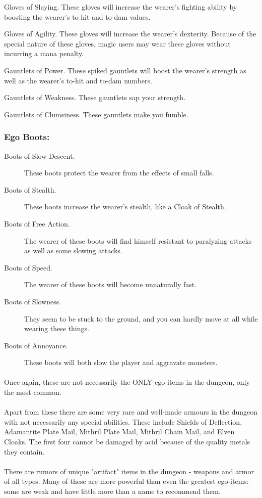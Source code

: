 Gloves of Slaying.
     These gloves will increase the wearer's fighting ability by boosting
     the wearer's to-hit and to-dam values.

Gloves of Agility.
     These gloves will increase the wearer's dexterity. Because of the
     special nature of these gloves, magic users may wear these gloves
     without incurring a mana penalty.

Gauntlets of Power.
     These spiked gauntlets will boost the wearer's strength as well as the
     wearer's to-hit and to-dam numbers.

Gauntlets of Weakness.
     These gauntlets sap your strength.

Gauntlets of Clumsiness.
     These gauntlets make you fumble.

\subsubsection{Ego Boots:}
\begin{description}
\item[Boots of Slow Descent.] These boots protect the wearer from the
effects of small falls.

\item[Boots of Stealth.] These boots increase the wearer's stealth, like
a Cloak of Stealth.

\item[Boots of Free Action.] The wearer of these boots will find himself
resistant to paralyzing attacks as well as some slowing attacks.

\item[Boots of Speed.] The wearer of these boots will become unnaturally
fast.

\item[Boots of Slowness.] They seem to be stuck to the ground, and you
can hardly move at all while wearing these things.

\item[Boots of Annoyance.] These boots will both slow the player and
aggravate monsters.
\end{description}

\paragraph{}Once again, these are not necessarily the ONLY ego-items in the dungeon,
only the most common.

\paragraph{}Apart from these there are some very rare and well-made armours in the
dungeon with not necessarily any special abilities. These include Shields of
Deflection, Adamantite Plate Mail, Mithril Plate Mail, Mithril Chain Mail,
and Elven Cloaks. The first four cannot be damaged by acid because of the
quality metals they contain.

\paragraph{}There are rumors of unique "artifact" items in the dungeon - weapons and
armor of all types. Many of these are more powerful than even the greatest
ego-items: some are weak and have little more than a name to recommend them. 


